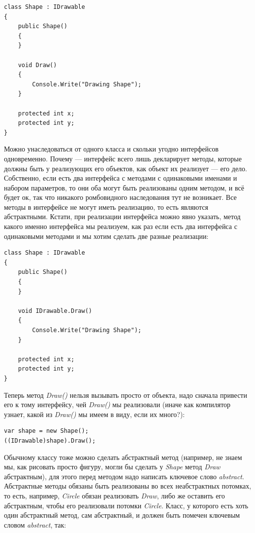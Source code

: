 \documentclass{../../text-style}
\begin{document}
\begin{verbatim}
class Shape : IDrawable
{
    public Shape() 
    { 
    }

    void Draw()
    {
        Console.Write("Drawing Shape");
    }

    protected int x;
    protected int y;
}
\end{verbatim}

Можно унаследоваться от одного класса и скольки угодно интерфейсов одновременно. Почему --- интерфейс всего лишь декларирует методы, которые должны быть у реализующих его объектов, как объект их реализует --- его дело. Собственно, если есть два интерфейса с методами с одинаковыми именами и набором параметров, то они оба могут быть реализованы одним методом, и всё будет ок, так что никакого ромбовидного наследования тут не возникает. Все методы в интерфейсе не могут иметь реализацию, то есть являются абстрактными. Кстати, при реализации интерфейса можно явно указать, метод какого именно интерфейса мы реализуем, как раз если есть два интерфейса с одинаковыми методами и мы хотим сделать две разные реализации:

\begin{verbatim}
class Shape : IDrawable
{
    public Shape() 
    { 
    }

    void IDrawable.Draw()
    {
        Console.Write("Drawing Shape");
    }

    protected int x;
    protected int y;
}
\end{verbatim}

Теперь метод \textit{Draw()} нельзя вызывать просто от объекта, надо сначала привести его к тому интерфейсу, чей \textit{Draw()} мы реализовали (иначе как компилятор узнает, какой из \textit{Draw()} мы имеем в виду, если их много?):

\begin{verbatim}
var shape = new Shape();
((IDrawable)shape).Draw();
\end{verbatim}

Обычному классу тоже можно сделать абстрактный метод (например, не знаем мы, как рисовать просто фигуру, могли бы сделать у \textit{Shape} метод \textit{Draw} абстрактным), для этого перед методом надо написать ключевое слово \textit{abstract}. Абстрактные методы обязаны быть реализованы во всех неабстрактных потомках, то есть, например, \textit{Circle} обязан реализовать \textit{Draw}, либо же оставить его абстрактным, чтобы его реализовали потомки \textit{Circle}. Класс, у которого есть хоть один абстрактный метод, сам абстрактный, и должен быть помечен ключевым словом \textit{abstract}, так:
\end{document}
